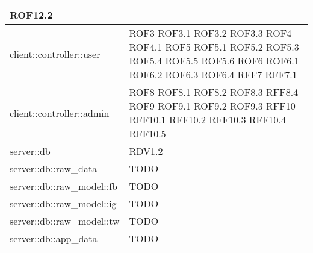 \begin{center}
\begin{longtable}{| p{9cm} | p{4cm} |}
\newline ROF12.2 \\
\hline
client::controller::user  &  ROF3 \newline ROF3.1 \newline ROF3.2 \newline ROF3.3 \newline ROF4 
\newline ROF4.1 \newline ROF5 \newline ROF5.1 \newline ROF5.2 \newline ROF5.3 \newline ROF5.4
\newline ROF5.5  \newline ROF5.6 \newline ROF6 \newline ROF6.1 \newline ROF6.2 \newline ROF6.3 \newline ROF6.4 \newline RFF7 \newline RFF7.1 \\
\hline
client::controller::admin  &  ROF8 \newline ROF8.1 \newline ROF8.2 \newline ROF8.3 \newline RFF8.4
\newline ROF9 \newline ROF9.1 \newline ROF9.2 \newline ROF9.3 \newline RFF10 \newline RFF10.1
\newline RFF10.2 \newline RFF10.3 \newline RFF10.4 \newline RFF10.5 \\
\hline
server::db  & RDV1.2 \\
\hline
server::db::raw\_data  &  TODO \\
\hline
server::db::raw\_model::fb  & TODO \\
\hline
server::db::raw\_model::ig  & TODO \\
\hline
server::db::raw\_model::tw  & TODO \\
\hline
server::db::app\_data  &  TODO \\

\end{longtable}
\end{center}
